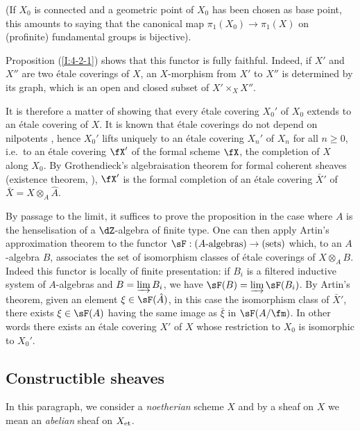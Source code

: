 (If $X_0$ is connected and a geometric point of $X_0$ has been chosen as
base point, this amounts to saying that the canonical map
$\pi_1(X_0)\to \pi_1(X)$ on (profinite) fundamental groups is
bijective).

Proposition (\ref{I:4-2-1}) shows that this functor is fully faithful. Indeed,
if $X'$ and $X''$ are two \'etale coverings of $X$, an
$X$-morphism from $X'$ to $X''$ is determined by its graph, which is an
open and closed subset of $X'\times_X X''$.

It is therefore a matter of showing that every \'etale covering $X_0'$ of $X_0$
extends to an \'etale covering of $X$. It is known that \'etale coverings do
not depend on nilpotents \cite[ch.1]{sga1}, hence
$X_0'$ lifts uniquely to an \'etale covering $X_n'$ of
$X_n$ for all $n\geqslant 0$, i.e.\ to an \'etale covering
$\fX'$ of the formal scheme $\fX$, the completion of $X$ along $X_0$. By
Grothendieck's algebraisation theorem for formal coherent sheaves
(existence theorem, \cite[III.5]{ega}), $\fX'$ is the
formal completion of an \'etale covering $\bar X'$ of
$\bar X=X\otimes_A \hat A$.

By passage to the limit, it suffices to prove the proposition in the case
where $A$ is the henselisation of a $\dZ$-algebra of finite type. One can then
apply Artin's approximation theorem to the functor
$\sF:(\textnormal{$A$-algebras}) \to (\textnormal{sets})$ which, to an
$A$-algebra $B$, associates the set of isomorphism classes of
\'etale coverings of $X\otimes_A B$. Indeed this functor is locally of
finite presentation: if $B_i$ is a filtered inductive system of
$A$-algebras and $B=\varinjlim B_i$, we have $\sF(B) = \varinjlim \sF(B_i)$.
By Artin's theorem, given an element
$\xi\in \sF(\hat A)$, in this case the isomorphism class of $\bar X'$, there
exists $\xi\in \sF(A)$ having the same image as $\bar\xi$ in $\sF(A/\fm)$.
In other words there exists an \'etale covering $X'$ of $X$ whose restriction
to $X_0$ is isomorphic to $X_0'$. 










\subsection{Constructible sheaves}\label{I:4-3}

In this paragraph, we consider a \emph{noetherian} scheme $X$ and by a
sheaf on $X$ we mean an \emph{abelian} sheaf on ${X}_{\textnormal{et}}$. 





